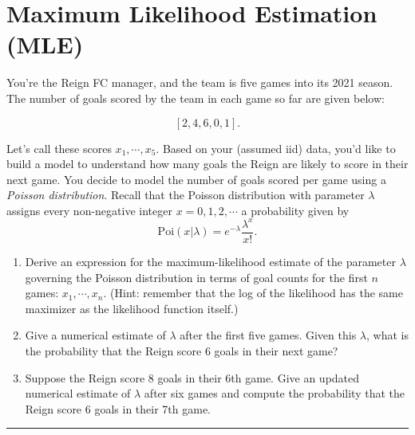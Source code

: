 \documentclass{article}
\begin{document}
\section*{Maximum Likelihood Estimation (MLE)}

\begin{aprob}
    You're the Reign FC manager, and the team is five games into its 2021 season. The number of goals scored by the team in each game so far are given below:

    \[
      [2, 4, 6, 0, 1].
    \]

    Let's call these scores $x_1, \cdots, x_5$. Based on your (assumed iid) data, you'd like to build a model to understand how many goals the Reign are likely to score in their next game. You decide to model the number of goals scored per game using a \emph{Poisson distribution}. Recall that the Poisson distribution with parameter $\lambda$ assigns every non-negative integer $x = 0, 1, 2, \cdots$ a probability given by
    \[
      \mathrm{Poi}(x | \lambda) = e^{-\lambda} \frac{\lambda ^ x}{x!}.
    \]

    \begin{enumerate}
        \item {} Derive an expression for the maximum-likelihood estimate of the parameter $\lambda$ governing the Poisson distribution in terms of goal counts for the first $n$ games: $x_1, \cdots, x_n$. (Hint: remember that the log of the likelihood has the same maximizer as the likelihood function itself.)

        \item {} Give a numerical estimate of $\lambda$ after the first five games. Given this $\lambda$, what is the probability that the Reign score $6$ goals in their next game?
        \item {} Suppose the Reign score 8 goals in their 6th game. Give an updated numerical estimate of $\lambda$ after six games and compute the probability that the Reign score $6$ goals in their 7th game.
    \end{enumerate}

    \rule{\textwidth}{0.25pt}


\end{aprob}
\end{document}
